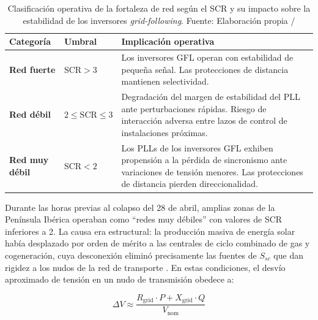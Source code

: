 \begin{table}[H]
    \centering
    \caption[Clasificación de la fortaleza de red según el Short Circuit Ratio (SCR).]{%
    Clasificación operativa de la fortaleza de red según el SCR y su
    impacto sobre la estabilidad de los inversores
    \textit{grid-following}. Fuente: Elaboración propia /
    \cite{nrel2025}}
    \vspace{0.3cm}
    \label{tab:scr_clasificacion}
    \small
    \begin{tabularx}{\textwidth}{>{\bfseries}p{3.2cm}
                                  >{\centering\arraybackslash}p{2.2cm}
                                  X}
    \toprule
    \textbf{Categoría} & \textbf{Umbral} & \textbf{Implicación operativa} \\
    \midrule
    Red fuerte
        & $\mathrm{SCR} > 3$
        & Los inversores GFL operan con estabilidad de pequeña señal.
          Las protecciones de distancia mantienen selectividad. \\
    \addlinespace
    Red débil
        & $2 \leq \mathrm{SCR} \leq 3$
        & Degradación del margen de estabilidad del PLL ante
          perturbaciones rápidas. Riesgo de interacción adversa entre
          lazos de control de instalaciones próximas. \\
    \addlinespace
    Red muy débil
        & $\mathrm{SCR} < 2$
        & Los PLLs de los inversores GFL exhiben propensión a la
          pérdida de sincronismo ante variaciones de tensión menores.
          Las protecciones de distancia pierden direccionalidad. \\
    \bottomrule
    \end{tabularx}
\end{table}

Durante las horas previas al colapso del 28 de abril, amplias zonas de
la Península Ibérica operaban como ``redes muy débiles'' con valores de
SCR inferiores a 2. La causa era estructural: la producción masiva de
energía solar había desplazado por orden de mérito a las centrales de
ciclo combinado de gas y cogeneración, cuya desconexión eliminó
precisamente las fuentes de $S_{sc}$ que dan rigidez a los nudos de la
red de transporte \cite{nrel2025,icai2025}. En estas condiciones, el
desvío aproximado de tensión en un nudo de transmisión obedece a:

\begin{equation}
    \Delta V \approx \frac{R_{\mathrm{grid}} \cdot P +
                          X_{\mathrm{grid}} \cdot Q}{V_{\mathrm{nom}}}
    \label{eq:delta_v}
\end{equation}

